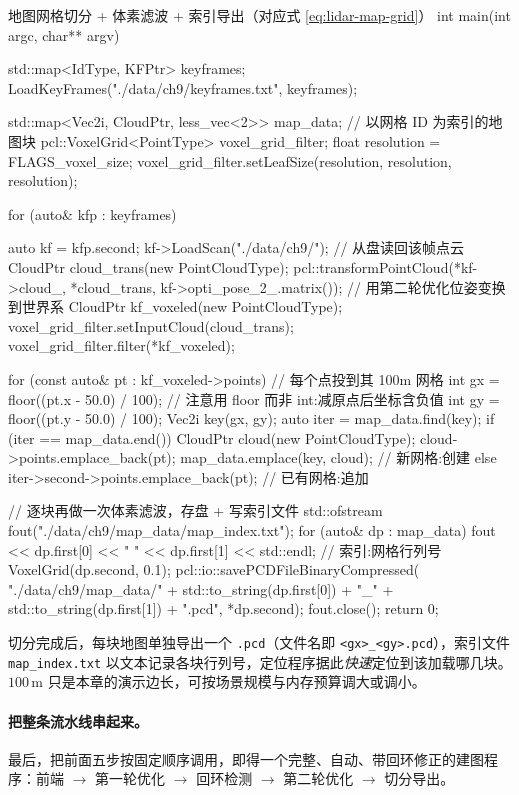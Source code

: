 \begin{codebox}[C++]{地图网格切分 + 体素滤波 + 索引导出（对应式 \ref{eq:lidar-map-grid}）}
int main(int argc, char** argv) {
  std::map<IdType, KFPtr> keyframes;
  LoadKeyFrames("./data/ch9/keyframes.txt", keyframes);

  std::map<Vec2i, CloudPtr, less_vec<2>> map_data;   // 以网格 ID 为索引的地图块
  pcl::VoxelGrid<PointType> voxel_grid_filter;
  float resolution = FLAGS_voxel_size;
  voxel_grid_filter.setLeafSize(resolution, resolution, resolution);

  for (auto& kfp : keyframes) {
    auto kf = kfp.second;
    kf->LoadScan("./data/ch9/");                      // 从盘读回该帧点云
    CloudPtr cloud_trans(new PointCloudType);
    pcl::transformPointCloud(*kf->cloud_, *cloud_trans,
                             kf->opti_pose_2_.matrix());   // 用第二轮优化位姿变换到世界系
    CloudPtr kf_voxeled(new PointCloudType);
    voxel_grid_filter.setInputCloud(cloud_trans);
    voxel_grid_filter.filter(*kf_voxeled);

    for (const auto& pt : kf_voxeled->points) {       // 每个点投到其 100m 网格
      int gx = floor((pt.x - 50.0) / 100);            // 注意用 floor 而非 int:减原点后坐标含负值
      int gy = floor((pt.y - 50.0) / 100);
      Vec2i key(gx, gy);
      auto iter = map_data.find(key);
      if (iter == map_data.end()) {
        CloudPtr cloud(new PointCloudType);
        cloud->points.emplace_back(pt);
        map_data.emplace(key, cloud);                 // 新网格:创建
      } else {
        iter->second->points.emplace_back(pt);        // 已有网格:追加
      }
    }
  }

  // 逐块再做一次体素滤波，存盘 + 写索引文件
  std::ofstream fout("./data/ch9/map_data/map_index.txt");
  for (auto& dp : map_data) {
    fout << dp.first[0] << " " << dp.first[1] << std::endl; // 索引:网格行列号
    VoxelGrid(dp.second, 0.1);
    pcl::io::savePCDFileBinaryCompressed(
        "./data/ch9/map_data/" + std::to_string(dp.first[0]) + "_"
        + std::to_string(dp.first[1]) + ".pcd", *dp.second);
  }
  fout.close();
  return 0;
}
\end{codebox}

切分完成后，每块地图单独导出一个 \texttt{.pcd}（文件名即 \texttt{<gx>\_<gy>.\allowbreak pcd}），索引文件 \texttt{map\_index.\allowbreak txt} 以文本记录各块行列号，定位程序据此\emph{快速}定位到该加载哪几块。$100$\,m 只是本章的演示边长，可按场景规模与内存预算调大或调小。

\paragraph{把整条流水线串起来。}
最后，把前面五步按固定顺序调用，即得一个完整、自动、带回环修正的建图程序\cite{gao2023slamad}：前端 $\to$ 第一轮优化 $\to$ 回环检测 $\to$ 第二轮优化 $\to$ 切分导出。

